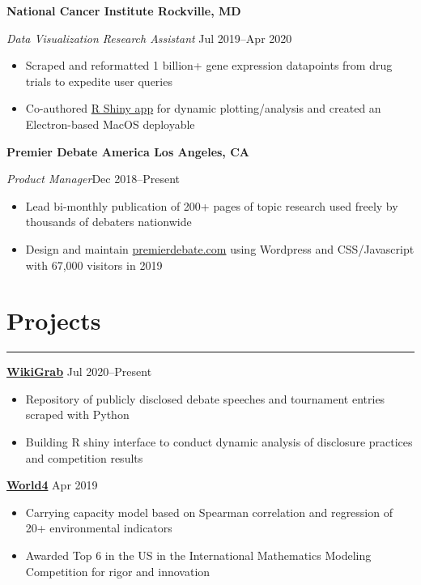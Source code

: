 \documentclass[11pt]{article}
\newcommand{\resumesection}[1]{\vspace{-0.3cm}\section*{\color{highlight}#1}\vspace{-0.3cm}\hrule\vspace{0.3cm}}
\begin{document}
\textbf{National Cancer Institute \hfill Rockville, MD}\par

\textit{Data Visualization Research Assistant} \hfill Jul 2019--Apr 2020 \par
\begin{itemize}
	\item Scraped and reformatted 1 billion+ gene expression datapoints from drug trials to expedite user queries
	\item Co-authored \href{https://github.com/petezh/TP-Workbench}{R Shiny app} for dynamic plotting/analysis and created an Electron-based MacOS deployable
\end{itemize}

\textbf{Premier Debate America \hfill Los Angeles, CA} \par

\textit{Product Manager}\hfill Dec 2018--Present
\begin{itemize}
	\item Lead bi-monthly publication of 200+ pages of topic research used freely by thousands of debaters nationwide
	\item Design and maintain \href{https://www.premierdebate.com/briefs/}{premierdebate.com} using Wordpress and CSS/Javascript with 67,000 visitors in 2019
\end{itemize}\vspace{0.1cm}


\resumesection{Projects}

\textbf{\href{https://github.com/petezh/Disclosure}{WikiGrab}} \hfill Jul 2020--Present \par
\begin{itemize}
	\item Repository of publicly disclosed debate speeches and tournament entries scraped with Python
	\item Building R shiny interface to conduct dynamic analysis of disclosure practices and competition results
\end{itemize}\vspace{0.1cm} \par

\textbf{\href{https://github.com/gautomdas/IMMC-World4/blob/master/US-9365.pdf}{World4}} \hfill Apr 2019\par
\begin{itemize}
	\item Carrying capacity model based on Spearman correlation and regression of 20+ environmental indicators
	\item Awarded Top 6 in the US in the International Mathematics Modeling Competition for rigor and innovation
\end{itemize}\vspace{0.1cm} \par
\end{document}
